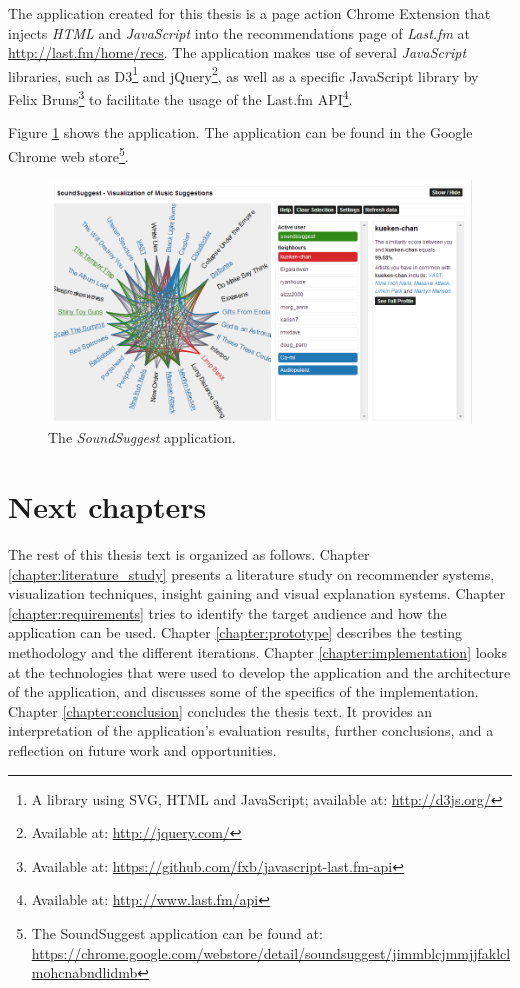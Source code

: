 The application created for this thesis is a page action Chrome Extension that injects \emph{HTML} and \emph{JavaScript} into the recommendations page of \emph{Last.fm} at \url{http://last.fm/home/recs}. The application makes use of several \emph{JavaScript} libraries, such as D3\footnote{A library using SVG, HTML and JavaScript\cite{bostock:2012:d3js}; available at: \url{http://d3js.org/}} and jQuery\footnote{Available at: \url{http://jquery.com/}}, as well as a specific JavaScript library by Felix Bruns\footnote{Available at: \url{https://github.com/fxb/javascript-last.fm-api}} to facilitate the usage of the Last.fm API\footnote{Available at: \url{http://www.last.fm/api}}.

Figure \ref{figure:soundsuggest} shows the application. The application can be found in the Google Chrome web store\footnote{The SoundSuggest application can be found at: \url{https://chrome.google.com/webstore/detail/soundsuggest/jimmblcjmmjjfaklclmohcnabndlidmb}}.

\begin{figure}
	\begin{center}
		\includegraphics[width=\columnwidth]{img/soundsuggest}%
	\end{center}
	\caption{The \emph{SoundSuggest} application.}
	\label{figure:soundsuggest}
\end{figure}


\section{Next chapters}\label{chapter:introduction:section:chapters}

The rest of this thesis text is organized as follows. Chapter \ref{chapter:literature_study} presents a literature study on recommender systems, visualization techniques, insight gaining and visual explanation systems. Chapter \ref{chapter:requirements} tries to identify the target audience and how the application can be used. Chapter \ref{chapter:prototype} describes the testing methodology and the different iterations. Chapter \ref{chapter:implementation} looks at the technologies that were used to develop the application and the architecture of the application, and discusses some of the specifics of the implementation. Chapter \ref{chapter:conclusion} concludes the thesis text. It provides an interpretation of the application's evaluation results, further conclusions, and a reflection on future work and opportunities.

